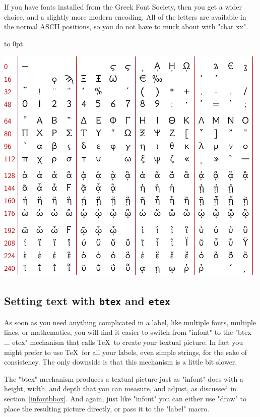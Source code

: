\documentclass[a4paper,landscape]{article}
\begin{document}
\medskip\noindent
If you have fonts installed from the Greek Font Society, then you get a wider
choice, and a slightly more modern encoding.  All of the letters are available in the
normal ASCII positions, so you do not have to muck about with "char xx".  

\vbox to 0pt{\centerline{\includegraphics{gfs-encoding.pdf}}\vss}



\newpage
\subsection{Setting text with \texttt{btex} and \texttt{etex}}\label{btex}

As soon as you need anything complicated in a label, like multiple fonts, multiple
lines, or mathematics, you will find it easier to switch from "infont" to the
"btex ... etex" mechanism that calls \TeX\ to create your textual picture.  In fact
you might prefer to use \TeX\ for all your labels, even simple strings, for the sake
of consistency.  The only downside is that this mechanism is a little bit slower.

The "btex" mechanism produces a textual picture just as "infont" does with a height,
width, and depth that you can measure, and adjust, as discussed in
section~\ref{infontbbox}.  And again, just like "infont" you can either use "draw"
to place the resulting picture directly, or pass it to the "label" macro.
\end{document}
